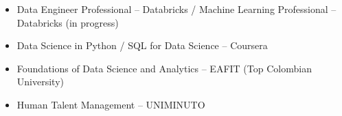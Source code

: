 \begin{itemize}[leftmargin=*]
  \item Data Engineer Professional – Databricks  / Machine Learning Professional – Databricks  (in progress)
  \item Data Science in Python / SQL for Data Science – Coursera
  \item Foundations of Data Science and Analytics – EAFIT (Top Colombian University)
  \item Human Talent Management – UNIMINUTO
\end{itemize}
